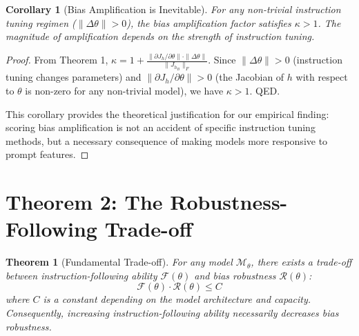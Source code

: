 \documentclass[11pt]{article}
\newtheorem{theorem}{Theorem}
\newtheorem{corollary}{Corollary}
\begin{document}
\begin{corollary}[Bias Amplification is Inevitable]
For any non-trivial instruction tuning regimen ($\|\Delta\theta\| > 0$), the bias amplification factor satisfies $\kappa > 1$. The magnitude of amplification depends on the strength of instruction tuning.
\end{corollary}

\begin{proof}
From Theorem 1, $\kappa = 1 + \frac{\|\partial J_h / \partial \theta\| \cdot \|\Delta\theta\|}{\|J_{h_B}\|_F}$. Since $\|\Delta\theta\| > 0$ (instruction tuning changes parameters) and $\|\partial J_h / \partial \theta\| > 0$ (the Jacobian of $h$ with respect to $\theta$ is non-zero for any non-trivial model), we have $\kappa > 1$. QED.

This corollary provides the theoretical justification for our empirical finding: scoring bias amplification is not an accident of specific instruction tuning methods, but a necessary consequence of making models more responsive to prompt features.
\end{proof}

\section{Theorem 2: The Robustness-Following Trade-off}

\begin{theorem}[Fundamental Trade-off]
For any model $\mathcal{M}_\theta$, there exists a trade-off between instruction-following ability $\mathcal{F}(\theta)$ and bias robustness $\mathcal{R}(\theta)$:
\begin{equation}
\mathcal{F}(\theta) \cdot \mathcal{R}(\theta) \leq C
\end{equation}
where $C$ is a constant depending on the model architecture and capacity. Consequently, increasing instruction-following ability necessarily decreases bias robustness.
\end{theorem}
\end{document}
